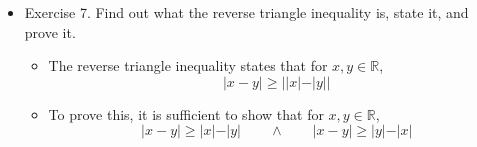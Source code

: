 \documentclass{article}
\begin{document}
\begin{itemize}
\begin{itemize}
\begin{itemize}
\begin{itemize}
                \item But this contradicts the assumption that $b \notin \mathbb{Q}$. Therefore, $a+b \notin \mathbb{Q}$.
            \end{itemize}
            \item (3) If $a$ is rational and $b$ is irrational, then $ab$ is irrational.
            \begin{itemize}
                \item Let $a \in \mathbb{Q}$ and $b \notin \mathbb{Q}$. Then $a = \frac{p}{q}$ so $\frac{1}{a} = \frac{q}{p} \in \mathbb{Q}$ as well. Suppose for contradiction that $ab \in \mathbb{Q}$.
                \item Then, $ab = c \in \mathbb{Q}$. This implies that $b = c\frac{1}{a} \in \mathbb{Q}$
                \item But this contradicts the assumption that $b \notin \mathbb{Q}$. Therefore, $ab \notin \mathbb{Q}$.
            \end{itemize}
        \end{itemize}
        \item (c) Explain why
        \[
        \varphi = 1+ \frac{1}{1+\frac{1}{1+\frac{1}{1+\ddots}}}
        \]
        \begin{itemize}
            \item We recall from (a) that $\varphi = 1 + \frac{1}{\varphi}$
            \item We can iterate by substituting the above as $\varphi$ on the RHS. This gives
            \[
            \varphi = 1 + \frac{1}{1+\frac{1}{\varphi}}
            \]
            \item We can keep repeating this, which yields the continued fraction stated in the question. Note that this gives the positive root because the construction remains positive at each step.
        \end{itemize}
    \end{itemize}
    \item Exercise 7. Find out what the reverse triangle inequality is, state it, and prove it.
    \begin{itemize}
        \item The reverse triangle inequality states that for $x,y \in \mathbb{R}$,
        \[
        \vert x - y \vert \ge \vert \vert x \vert - \vert y \vert \vert
        \]
        \item To prove this, it is sufficient to show that for $x,y \in \mathbb{R}$,
        \[
        \vert x - y \vert \ge \vert x \vert - \vert y \vert \qquad \wedge \qquad \vert x-y \vert \ge \vert y \vert - \vert x \vert
\]
\end{itemize}
\end{itemize}
\end{document}
